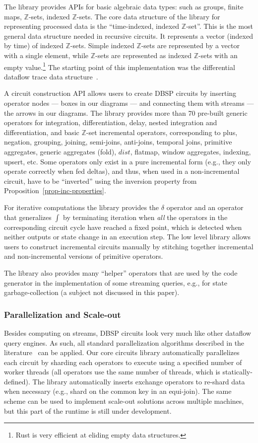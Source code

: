 \documentclass[twocolumn
]{svjour3}
\numberwithin{equation}{section}
\newcommand{\dbsp}{DBSP\xspace}
\newcommand{\zr}{$\Z$-set\xspace}
\newcommand{\zrs}{$\Z$-sets\xspace} %
\newcommand{\Z}{\mathbb{Z}}  %
\newcommand{\distinct}{\mathit{dist}}  %
\begin{document}
The library provides APIs for basic algebraic data types: such as
groups, finite maps, \zrs, indexed \zrs.  The core data structure of
the library for representing processed data is the ``time-indexed,
indexed \zr''.  This is the most general data structure needed in
recursive circuits.  It represents a vector (indexed by time) of
indexed \zrs.  Simple indexed \zrs are represented by a vector with a
single element, while \zrs are represented as indexed \zrs with an
empty value.\footnote{Rust is very efficient at eliding empty data
structures.}  The starting point of this implementation was the
differential dataflow trace data structure~\cite{dd-crate}.

A circuit construction API allows users to create \dbsp circuits by
inserting operator nodes --- boxes in our diagrams --- and connecting
them with streams --- the arrows in our diagrams.  The library
provides more than 70 pre-built generic operators for integration,
differentiation, delay, nested integration and differentiation, and
basic \zr incremental operators, corresponding to plus, negation,
grouping, joining, semi-joins, anti-joins, temporal joins, primitive
aggregates, generic aggregates (fold), $\distinct$, flatmap, window
aggregates, indexing, upsert, etc.  Some operators only exist in a
pure incremental form (e.g., they only operate correctly when fed
deltas), and thus, when used in a non-incremental circuit, have to be
``inverted'' using the inversion property from
Proposition~\ref{prop-inc-properties}.

For iterative computations the library provides the $\delta$ operator
and an operator that generalizes $\int$ by terminating iteration when
\emph{all} the operators in the corresponding circuit cycle have
reached a fixed point, which is detected when neither outputs or state
change in an execution step.  The low level library allows users to
construct incremental circuits manually by stitching together
incremental and non-incremental versions of primitive operators.

The library also provides many ``helper'' operators that are used by
the code generator in the implementation of some streaming queries,
e.g., for state garbage-collection (a subject not discussed in this
paper).

\subsubsection{Parallelization and Scale-out}

Besides computing on streams, \dbsp circuits look very much like other
dataflow query engines.  As such, all standard parallelization
algorithms described in the literature~\cite{Graefe-sigmod90} can be
applied.  Our core circuits library automatically parallelizes each
circuit by sharding each operators to execute using a specified number
of worker threads (all operators use the same number of threads, which
is statically-defined).  The library automatically inserts exchange
operators to re-shard data when necessary (e.g., shard on the common
key in an equi-join).  The same scheme can be used to implement
scale-out solutions across multiple machines, but this part of the
runtime is still under development.
\end{document}
